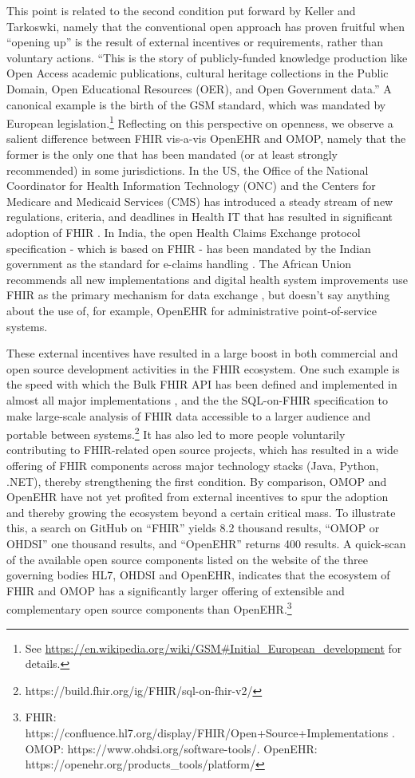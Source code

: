 \documentclass[
  authoryear]{elsarticle}
\begin{document}
This point is related to the second condition put forward by Keller and
Tarkoswki, namely that the conventional open approach has proven
fruitful when ``opening up'' is the result of external incentives or
requirements, rather than voluntary actions. ``This is the story of
publicly-funded knowledge production like Open Access academic
publications, cultural heritage collections in the Public Domain, Open
Educational Resources (OER), and Open Government data.''
\citep{keller2021paradox} A canonical example is the birth of the GSM
standard, which was mandated by European legislation.\footnote{See
  \url{https://en.wikipedia.org/wiki/GSM\#Initial_European_development}
  for details.} Reflecting on this perspective on openness, we observe a
salient difference between FHIR vis-a-vis OpenEHR and OMOP, namely that
the former is the only one that has been mandated (or at least strongly
recommended) in some jurisdictions. In the US, the Office of the
National Coordinator for Health Information Technology (ONC) and the
Centers for Medicare and Medicaid Services (CMS) has introduced a steady
stream of new regulations, criteria, and deadlines in Health IT that has
resulted in significant adoption of FHIR \citep{firely2023fhir}. In
India, the open Health Claims Exchange protocol specification - which is
based on FHIR - has been mandated by the Indian government as the
standard for e-claims handling \citep{india2020national, hcx}. The
African Union recommends all new implementations and digital health
system improvements use FHIR as the primary mechanism for data exchange
\citep{tilahun2023african}, but doesn't say anything about the use of,
for example, OpenEHR for administrative point-of-service systems.

These external incentives have resulted in a large boost in both
commercial and open source development activities in the FHIR ecosystem.
One such example is the speed with which the Bulk FHIR API has been
defined and implemented in almost all major implementations
\citep{mandl2020push, jones2021landscape}, and the the SQL-on-FHIR
specification to make large-scale analysis of FHIR data accessible to a
larger audience and portable between systems.\footnote{https://build.fhir.org/ig/FHIR/sql-on-fhir-v2/}
It has also led to more people voluntarily contributing to FHIR-related
open source projects, which has resulted in a wide offering of FHIR
components across major technology stacks (Java, Python, .NET), thereby
strengthening the first condition. By comparison, OMOP and OpenEHR have
not yet profited from external incentives to spur the adoption and
thereby growing the ecosystem beyond a certain critical mass. To
illustrate this, a search on GitHub on ``FHIR'' yields 8.2 thousand
results, ``OMOP or OHDSI'' one thousand results, and ``OpenEHR'' returns
400 results. A quick-scan of the available open source components listed
on the website of the three governing bodies HL7, OHDSI and OpenEHR,
indicates that the ecosystem of FHIR and OMOP has a significantly larger
offering of extensible and complementary open source components than
OpenEHR.\footnote{FHIR:
  https://confluence.hl7.org/display/FHIR/Open+Source+Implementations .
  OMOP: https://www.ohdsi.org/software-tools/. OpenEHR:
  https://openehr.org/products\_tools/platform/}
\end{document}
